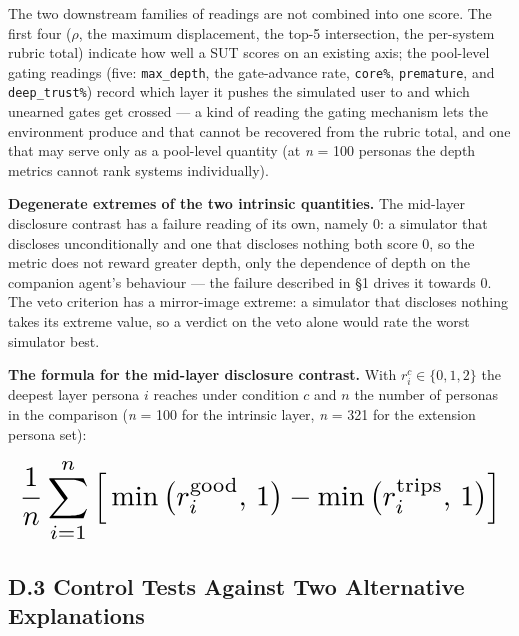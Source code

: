 \documentclass[letterpaper]{article}
\begin{document}
The two downstream families of readings are not combined into one score. The first four ($\rho$, the maximum displacement, the top-5 intersection, the per-system rubric total) indicate how well a SUT scores on an existing axis; the pool-level gating readings (five: \texttt{max\_depth}, the gate-advance rate, \texttt{core\%}, \texttt{premature}, and \texttt{deep\_trust\%}) record which layer it pushes the simulated user to and which unearned gates get crossed --- a kind of reading the gating mechanism lets the environment produce and that cannot be recovered from the rubric total, and one that may serve only as a pool-level quantity (at \textit{n} = 100 personas the depth metrics cannot rank systems individually).

\textbf{Degenerate extremes of the two intrinsic quantities.} The mid-layer disclosure contrast has a failure reading of its own, namely 0: a simulator that discloses unconditionally and one that discloses nothing both score 0, so the metric does not reward greater depth, only the dependence of depth on the companion agent's behaviour --- the failure described in \S{}1 drives it towards 0. The veto criterion has a mirror-image extreme: a simulator that discloses nothing takes its extreme value, so a verdict on the veto alone would rate the worst simulator best.

\textbf{The formula for the mid-layer disclosure contrast.} With $r_i^{c} \in \{0,1,2\}$ the deepest layer persona $i$ reaches under condition $c$ and $n$ the number of personas in the comparison (\textit{n} = 100 for the intrinsic layer, \textit{n} = 321 for the extension persona set):

\begin{equation*}
\resizebox{\columnwidth}{!}{$\displaystyle \frac{1}{n}\sum_{i=1}^{n}\Big[\min\big(r_i^{\mathrm{good}},\,1\big)-\min\big(r_i^{\mathrm{trips}},\,1\big)\Big]$}
\end{equation*}


\subsection*{D.3 Control Tests Against Two Alternative Explanations}
\end{document}
